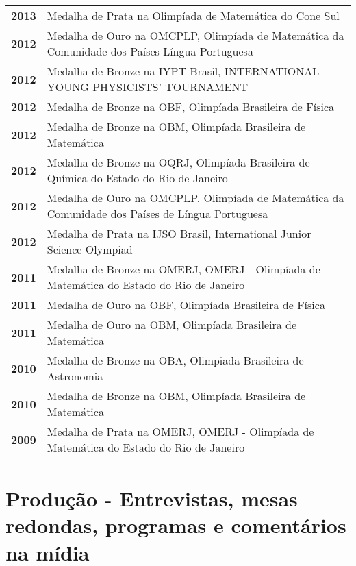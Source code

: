 \documentclass[a4paper, oneside, final]{scrartcl} %
\begin{document}
\begin{center}
\begin{tabular}{ @{} >{\bfseries}l @{\hspace{5ex}} l }
2013 & \multicolumn{1}{p{15cm}}{\raggedright Medalha de Prata na Olimpíada de Matemática do Cone Sul} \\
2012 & \multicolumn{1}{p{15cm}}{\raggedright Medalha de Ouro na OMCPLP, Olimpíada de Matemática da Comunidade dos Países Língua Portuguesa} \\
2012 & \multicolumn{1}{p{15cm}}{\raggedright Medalha de Bronze na IYPT Brasil, INTERNATIONAL YOUNG PHYSICISTS' TOURNAMENT} \\
2012 & \multicolumn{1}{p{15cm}}{\raggedright Medalha de Bronze na OBF, Olimpíada Brasileira de Física} \\
2012 & \multicolumn{1}{p{15cm}}{\raggedright Medalha de Bronze na OBM, Olimpíada Brasileira de Matemática} \\
2012 & \multicolumn{1}{p{15cm}}{\raggedright Medalha de Bronze na OQRJ, Olimpíada Brasileira de Química do Estado do Rio de Janeiro} \\
2012 & \multicolumn{1}{p{15cm}}{\raggedright Medalha de Ouro na OMCPLP, Olimpíada de Matemática da Comunidade dos Países de Língua Portuguesa} \\
2012 & \multicolumn{1}{p{15cm}}{\raggedright Medalha de Prata na IJSO Brasil, International Junior Science Olympiad} \\
2011 & \multicolumn{1}{p{15cm}}{\raggedright Medalha de Bronze na OMERJ, OMERJ - Olimpíada de Matemática do Estado do Rio de Janeiro} \\
2011 & \multicolumn{1}{p{15cm}}{\raggedright Medalha de Ouro na OBF, Olimpíada Brasileira de Física} \\
2011 & \multicolumn{1}{p{15cm}}{\raggedright Medalha de Ouro na OBM, Olimpíada Brasileira de Matemática} \\
2010 & \multicolumn{1}{p{15cm}}{\raggedright Medalha de Bronze na OBA, Olimpiada Brasileira de Astronomia} \\
2010 & \multicolumn{1}{p{15cm}}{\raggedright Medalha de Bronze na OBM, Olimpíada Brasileira de Matemática} \\
2009 & \multicolumn{1}{p{15cm}}{\raggedright Medalha de Prata na OMERJ, OMERJ - Olimpíada de Matemática do Estado do Rio de Janeiro}
\end{tabular}


\section{Produção - Entrevistas, mesas redondas, programas e comentários na
mídia}


\end{center}
\end{document}
